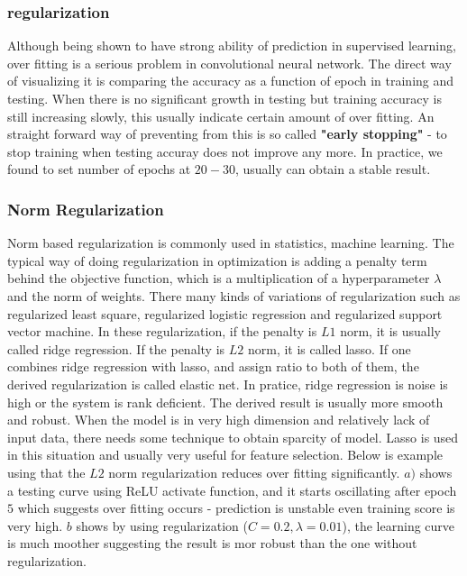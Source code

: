 \documentclass[paper=a4, fontsize=11pt]{scrartcl} %
\numberwithin{equation}{section} %
\numberwithin{figure}{section} %
\numberwithin{table}{section} %
\begin{document}
\subsubsection{\textbf{regularization}}
Although being shown to have strong ability of prediction in supervised learning, over fitting is a serious problem in convolutional neural network. The direct way of visualizing it is comparing the accuracy as a function of epoch in training and testing. When there is no significant growth in testing but training accuracy is still increasing slowly, this usually indicate certain amount of over fitting. An straight forward way of preventing from this is so called \textbf{"early stopping"} - to stop training when testing accuray does not improve any more. In practice, we found to set number of epochs at $20-30$, usually can obtain a stable result.

\subsubsection{\textbf{Norm Regularization}}
Norm based regularization is commonly used in statistics, machine learning. The typical way of doing regularization in optimization is adding a penalty term behind the objective function, which is a multiplication of a hyperparameter $\lambda$ and the norm of weights. There many kinds of variations of regularization such as regularized least square, regularized logistic regression and regularized support vector machine. In these regularization, if the penalty is $L1$ norm, it is usually called ridge regression. If the penalty is $L2$ norm, it is called lasso. If one combines ridge regression with lasso, and assign ratio to both of them, the derived regularization is called elastic net. In pratice, ridge regression is noise is high or the system is rank deficient. The derived result is usually more smooth and robust. When the model is in very high dimension and relatively lack of input data, there needs some technique to obtain sparcity of model. Lasso is used in this situation and usually very useful for feature selection. Below is example using that the $L2$ norm regularization reduces over fitting significantly. $a)$ shows a testing curve using ReLU activate function, and it starts oscillating after epoch $5$ which suggests over fitting occurs - prediction is unstable even training score is very high. $b$ shows by using regularization ($C=0.2, \lambda=0.01$), the learning curve is much moother suggesting the result
 is mor robust than the one without regularization.
\end{document}
